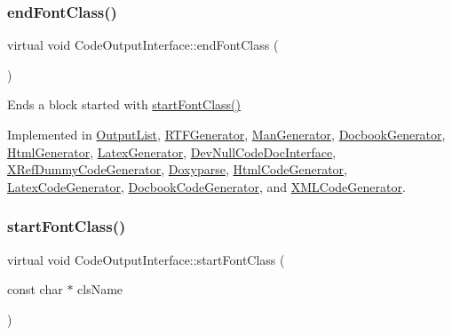 \subsubsection{\texorpdfstring{endFontClass()}{endFontClass()}}
{\footnotesize\ttfamily virtual void Code\+Output\+Interface\+::end\+Font\+Class (\begin{DoxyParamCaption}{ }\end{DoxyParamCaption})\hspace{0.3cm}{\ttfamily [pure virtual]}}

Ends a block started with \mbox{\hyperlink{class_code_output_interface_ac90f75968cdcf127e0b02938bdb49d87}{start\+Font\+Class()}} 

Implemented in \mbox{\hyperlink{class_output_list_a484c1bcfcffe7a6cb94316ac8df64b61}{Output\+List}}, \mbox{\hyperlink{class_r_t_f_generator_a8753e9a10c126e0f8b9af7ff9783afcd}{R\+T\+F\+Generator}}, \mbox{\hyperlink{class_man_generator_a35a79c6fc4ee7bd9eeadb74181e368d1}{Man\+Generator}}, \mbox{\hyperlink{class_docbook_generator_a857d641f5f3894a4053037e842d45a10}{Docbook\+Generator}}, \mbox{\hyperlink{class_html_generator_aca25e58aa19b44b41de489dc966e4b5d}{Html\+Generator}}, \mbox{\hyperlink{class_latex_generator_a553927a6db74aca325fa50bd666b44b0}{Latex\+Generator}}, \mbox{\hyperlink{class_dev_null_code_doc_interface_adb2939da13563e88a225059de3d767e5}{Dev\+Null\+Code\+Doc\+Interface}}, \mbox{\hyperlink{class_x_ref_dummy_code_generator_a9a502e533ffc65e8db2b84e07a0d468a}{X\+Ref\+Dummy\+Code\+Generator}}, \mbox{\hyperlink{class_doxyparse_a3c7ba846a59b1aff41ab0395b2e6dd8f}{Doxyparse}}, \mbox{\hyperlink{class_html_code_generator_a8efe5c697dc169b24b5e7da7cf54305e}{Html\+Code\+Generator}}, \mbox{\hyperlink{class_latex_code_generator_a2b3c977134c51f9775042a0c7f469077}{Latex\+Code\+Generator}}, \mbox{\hyperlink{class_docbook_code_generator_a06537ef3f7d9c2cb4b9b0293f43d9151}{Docbook\+Code\+Generator}}, and \mbox{\hyperlink{class_x_m_l_code_generator_adbf57d4544dc1c27571b472f3990a385}{X\+M\+L\+Code\+Generator}}.

\mbox{\label{class_code_output_interface_ac90f75968cdcf127e0b02938bdb49d87}} 
\subsubsection{\texorpdfstring{startFontClass()}{startFontClass()}}
{\footnotesize\ttfamily virtual void Code\+Output\+Interface\+::start\+Font\+Class (\begin{DoxyParamCaption}\item[{const char $\ast$}]{cls\+Name }\end{DoxyParamCaption})\hspace{0.3cm}{\ttfamily [pure virtual]}}

